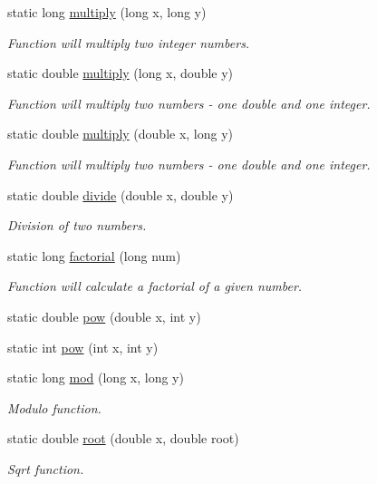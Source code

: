 \begin{DoxyCompactItemize}
static long \hyperlink{classmath_a35d65c04f2cc9e4565d4f11294e1d191}{multiply} (long x, long y)
\begin{DoxyCompactList}\small\item\em Function will multiply two integer numbers. \end{DoxyCompactList}\item 
static double \hyperlink{classmath_aedc67ea56f41744708cd85d151cf8973}{multiply} (long x, double y)
\begin{DoxyCompactList}\small\item\em Function will multiply two numbers -\/ one double and one integer. \end{DoxyCompactList}\item 
static double \hyperlink{classmath_afdcf0aa39976744ed21b47697dea0e55}{multiply} (double x, long y)
\begin{DoxyCompactList}\small\item\em Function will multiply two numbers -\/ one double and one integer. \end{DoxyCompactList}\item 
static double \hyperlink{classmath_a52284400f6e457532e27c40b553e4f01}{divide} (double x, double y)
\begin{DoxyCompactList}\small\item\em Division of two numbers. \end{DoxyCompactList}\item 
static long \hyperlink{classmath_acd82ca2b91e16ffd3c74e361d659f890}{factorial} (long num)
\begin{DoxyCompactList}\small\item\em Function will calculate a factorial of a given number. \end{DoxyCompactList}\item 
static double \hyperlink{classmath_ab3dbc5879cf9cb642f8394cea68785c8}{pow} (double x, int y)
\item 
static int \hyperlink{classmath_a4d0742d73c59ffd903e3dcb50744c328}{pow} (int x, int y)
\item 
static long \hyperlink{classmath_a66b6b2c231324eec1c7ccc3919e34768}{mod} (long x, long y)
\begin{DoxyCompactList}\small\item\em Modulo function. \end{DoxyCompactList}\item 
static double \hyperlink{classmath_a9bce1ed75fbc2f3d7051c2a47088754b}{root} (double x, double root)
\begin{DoxyCompactList}\small\item\em Sqrt function. \end{DoxyCompactList}\end{DoxyCompactItemize}


